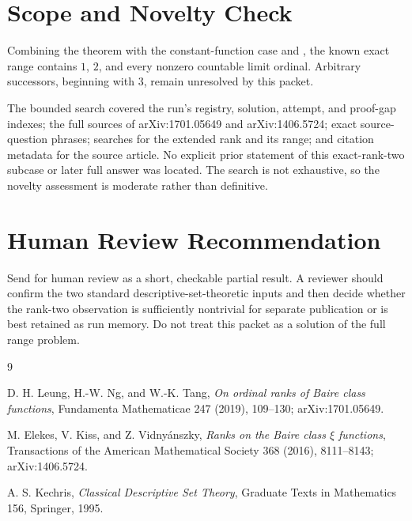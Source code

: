 \documentclass[11pt]{article}
\begin{document}
\section*{Scope and Novelty Check}

Combining the theorem with the constant-function case and
\cite[Proposition 3.6]{LNT}, the known exact range contains $1$, $2$, and
every nonzero countable limit ordinal.  Arbitrary successors, beginning with
$3$, remain unresolved by this packet.

The bounded search covered the run's registry, solution, attempt, and
proof-gap indexes; the full sources of arXiv:1701.05649 and arXiv:1406.5724;
exact source-question phrases; searches for the extended rank and its range;
and citation metadata for the source article.  No explicit prior statement of
this exact-rank-two subcase or later full answer was located.  The search is
not exhaustive, so the novelty assessment is moderate rather than definitive.

\section*{Human Review Recommendation}

Send for human review as a short, checkable partial result.  A reviewer should
confirm the two standard descriptive-set-theoretic inputs and then decide
whether the rank-two observation is sufficiently nontrivial for separate
publication or is best retained as run memory.  Do not treat this packet as a
solution of the full range problem.

\begin{thebibliography}{9}

D. H. Leung, H.-W. Ng, and W.-K. Tang,
\emph{On ordinal ranks of Baire class functions},
Fundamenta Mathematicae 247 (2019), 109--130;
arXiv:1701.05649.

M. Elekes, V. Kiss, and Z. Vidny\'{a}nszky,
\emph{Ranks on the Baire class $\xi$ functions},
Transactions of the American Mathematical Society 368 (2016), 8111--8143;
arXiv:1406.5724.

A. S. Kechris,
\emph{Classical Descriptive Set Theory},
Graduate Texts in Mathematics 156, Springer, 1995.

\end{thebibliography}
\end{document}

